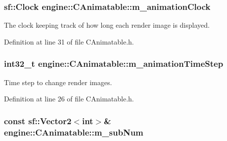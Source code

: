 \hypertarget{classengine_1_1CAnimatable_ac7041497fc032eb2a6335fc9e68aba1c}{
\subsubsection[{m\-\_\-animation\-Clock}]{\setlength{\rightskip}{0pt plus 5cm}sf\-::\-Clock engine\-::\-C\-Animatable\-::m\-\_\-animation\-Clock\hspace{0.3cm}{\ttfamily [protected]}}}\label{classengine_1_1CAnimatable_ac7041497fc032eb2a6335fc9e68aba1c}


The clock keeping track of how long each render image is displayed. 



Definition at line 31 of file C\-Animatable.\-h.

\hypertarget{classengine_1_1CAnimatable_a5ad99730dad31f7b458fa99987970f3c}{
\subsubsection[{m\-\_\-animation\-Time\-Step}]{\setlength{\rightskip}{0pt plus 5cm}int32\-\_\-t engine\-::\-C\-Animatable\-::m\-\_\-animation\-Time\-Step\hspace{0.3cm}{\ttfamily [protected]}}}\label{classengine_1_1CAnimatable_a5ad99730dad31f7b458fa99987970f3c}


Time step to change render images. 



Definition at line 26 of file C\-Animatable.\-h.

\hypertarget{classengine_1_1CAnimatable_a75150745354ce35d66711d6613eb3be6}{
\subsubsection[{m\-\_\-sub\-Num}]{\setlength{\rightskip}{0pt plus 5cm}const sf\-::\-Vector2$<$int$>$\& engine\-::\-C\-Animatable\-::m\-\_\-sub\-Num\hspace{0.3cm}{\ttfamily [protected]}}}\label{classengine_1_1CAnimatable_a75150745354ce35d66711d6613eb3be6}


